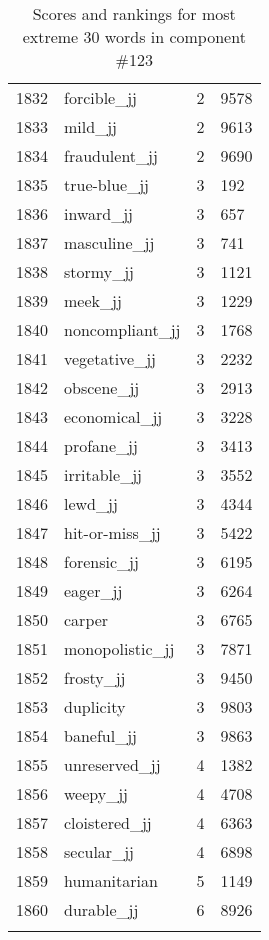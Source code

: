 \begin{longtable}[!htbp]{| rlr@{.}l |}
    1832 & forcible\_jj & 2 & 9578 \\
    1833 & mild\_jj & 2 & 9613 \\
    1834 & fraudulent\_jj & 2 & 9690 \\
    1835 & true-blue\_jj & 3 & 192 \\
    1836 & inward\_jj & 3 & 657 \\
    1837 & masculine\_jj & 3 & 741 \\
    1838 & stormy\_jj & 3 & 1121 \\
    1839 & meek\_jj & 3 & 1229 \\
    1840 & noncompliant\_jj & 3 & 1768 \\
    1841 & vegetative\_jj & 3 & 2232 \\
    1842 & obscene\_jj & 3 & 2913 \\
    1843 & economical\_jj & 3 & 3228 \\
    1844 & profane\_jj & 3 & 3413 \\
    1845 & irritable\_jj & 3 & 3552 \\
    1846 & lewd\_jj & 3 & 4344 \\
    1847 & hit-or-miss\_jj & 3 & 5422 \\
    1848 & forensic\_jj & 3 & 6195 \\
    1849 & eager\_jj & 3 & 6264 \\
    1850 & carper & 3 & 6765 \\
    1851 & monopolistic\_jj & 3 & 7871 \\
    1852 & frosty\_jj & 3 & 9450 \\
    1853 & duplicity & 3 & 9803 \\
    1854 & baneful\_jj & 3 & 9863 \\
    1855 & unreserved\_jj & 4 & 1382 \\
    1856 & weepy\_jj & 4 & 4708 \\
    1857 & cloistered\_jj & 4 & 6363 \\
    1858 & secular\_jj & 4 & 6898 \\
    1859 & humanitarian & 5 & 1149 \\
    1860 & durable\_jj & 6 & 8926 \\
    \hline
    \caption{Scores and rankings for most extreme 30 words in component \#123} \\
\end{longtable}
